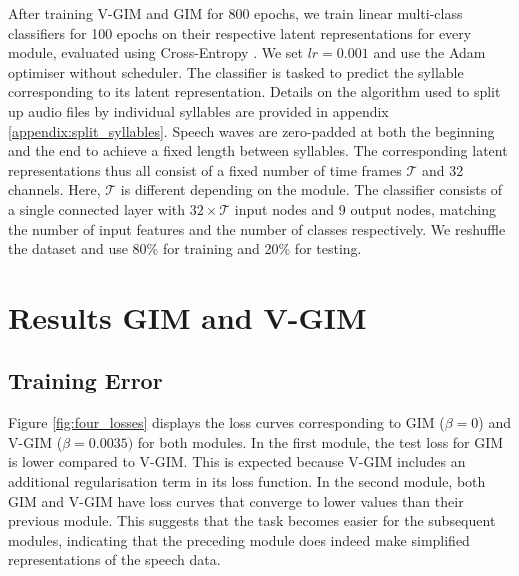 	
		After training V-GIM and GIM for 800 epochs, we train linear multi-class classifiers for 100 epochs on their respective latent representations for every module, evaluated using Cross-Entropy \citep{hoRealWorldWeightCrossEntropyLoss2020}. We set $lr=0.001$ and use the Adam optimiser without scheduler. The classifier is tasked to predict the syllable corresponding to its latent representation. Details on the algorithm used to split up audio files by individual syllables are provided in appendix \ref{appendix:split_syllables}. Speech waves are zero-padded at both the beginning and the end to achieve a fixed length between syllables. The corresponding latent representations thus all consist of a fixed number of time frames $\mathcal{T}$ and 32 channels. Here, $\mathcal{T}$ is different depending on the module. 
		The classifier consists of a single connected layer with $32 \times \mathcal{T}$ input nodes and 9 output nodes, matching the number of input features and the number of classes respectively.  We reshuffle the dataset and use 80\% for training and 20\% for testing.

	

	\section{Results GIM and V-GIM}	
	\subsection{Training Error} \label{cha:experiments_vgim_train_err}
		
		
		Figure \ref{fig:four_losses} displays the loss curves corresponding to GIM ($\beta=0$) and V-GIM ($\beta=0.0035)$ for both modules. In the first module, the test loss for GIM is lower compared to V-GIM. This is expected because V-GIM includes an additional regularisation term in its loss function. In the second module, both GIM and V-GIM have loss curves that converge to lower values than their previous module. This suggests that the task becomes easier for the subsequent modules, indicating that the preceding module does indeed make simplified representations of the speech data.
		
